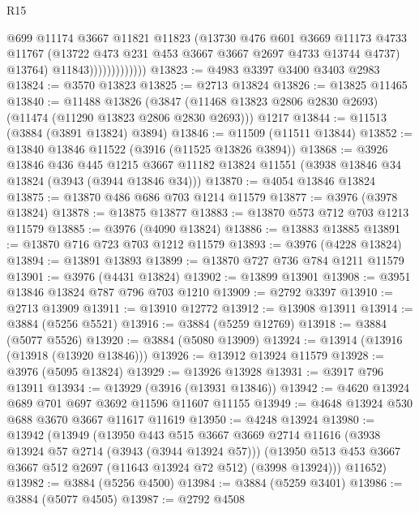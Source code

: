 \begin{lexlean}{R15}
\begin{coremodule}
                              @699
                              @11174
                              @3667
                              @11821
                              @11823
                              (@13730
                                @476
                                @601
                                @3669
                                @11173
                                @4733
                                @11767
                                (@13722 @473 @231 @453 @3667 @3667 @2697 @4733 @13744 @4737)
                                @13764)
                              @11843)))))))))))))
@13823 := @4983 @3397 @3400 @3403 @2983
@13824 := @3570 @13823
@13825 := @2713 @13824
@13826 := @13825 @11465
@13840 := @11488
    @13826
    (@3847 (@11468 @13823 @2806 @2830 @2693) (@11474 (@11290 @13823 @2806 @2830 @2693)))
    @1217
@13844 := @11513 (@3884 (@3891 @13824) @3894)
@13846 := @11509 (@11511 @13844)
@13852 := @13840 @13846 @11522 (@3916 (@11525 @13826 @3894))
@13868 := @3926
    @13846
    @436
    @445
    @1215
    @3667
    @11182
    @13824
    @11551
    (@3938 @13846 @34 @13824 (@3943 (@3944 @13846 @34)))
@13870 := @4054 @13846 @13824
@13875 := @13870 @486 @686 @703 @1214 @11579
@13877 := @3976 (@3978 @13824)
@13878 := @13875 @13877
@13883 := @13870 @573 @712 @703 @1213 @11579
@13885 := @3976 (@4090 @13824)
@13886 := @13883 @13885
@13891 := @13870 @716 @723 @703 @1212 @11579
@13893 := @3976 (@4228 @13824)
@13894 := @13891 @13893
@13899 := @13870 @727 @736 @784 @1211 @11579
@13901 := @3976 (@4431 @13824)
@13902 := @13899 @13901
@13908 := @3951 @13846 @13824 @787 @796 @703 @1210
@13909 := @2792 @3397
@13910 := @2713 @13909
@13911 := @13910 @12772
@13912 := @13908 @13911
@13914 := @3884 (@5256 @5521)
@13916 := @3884 (@5259 @12769)
@13918 := @3884 (@5077 @5526)
@13920 := @3884 (@5080 @13909)
@13924 := @13914 (@13916 (@13918 (@13920 @13846)))
@13926 := @13912 @13924 @11579
@13928 := @3976 (@5095 @13824)
@13929 := @13926 @13928
@13931 := @3917 @796 @13911
@13934 := @13929 (@3916 (@13931 @13846))
@13942 := @4620 @13924 @689 @701 @697 @3692 @11596 @11607 @11155
@13949 := @4648 @13924 @530 @688 @3670 @3667 @11617 @11619
@13950 := @4248 @13924
@13980 := @13942
    (@13949
      (@13950
        @443
        @515
        @3667
        @3669
        @2714
        @11616
        (@3938 @13924 @57 @2714 (@3943 (@3944 @13924 @57)))
        (@13950 @513 @453 @3667 @3667 @512 @2697 (@11643 @13924 @72 @512) (@3998 @13924)))
      @11652)
@13982 := @3884 (@5256 @4500)
@13984 := @3884 (@5259 @3401)
@13986 := @3884 (@5077 @4505)
@13987 := @2792 @4508

\end{coremodule}
\end{lexlean}

